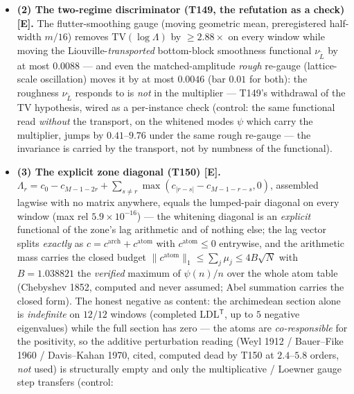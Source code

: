 \documentclass[11pt]{article}
\providecommand{\mE}{\textbf{[E]}}\providecommand{\mC}{\textbf{[C]}}
\begin{document}
\begin{itemize}[leftmargin=1.5em]
$\mathrm{TV}(\log\tilde\Lambda)=0$ \emph{exactly} on every window --- T149's elimination, not
reduction, of T148's blocking scalar --- with the certified entrywise sandwich
$\sigma=c_2/c_1=1.3868$--$2.5805$ (controls: a $1\%$ $Q^\star$ perturbation breaks the identity
at $4.99\times10^{-3}$, and on the shifted indefinite form $A-1.05\lambda_{\min}I$ the
completed-Cholesky floor \emph{refuses} on $12/12$ windows).
\item \textbf{(2) The two-regime discriminator (T149, the refutation as a check) \mE.} The
flutter-smoothing gauge (moving geometric mean, preregistered half-width $m/16$) removes
$\mathrm{TV}(\log\Lambda)$ by $\ge2.88\times$ on every window while moving the
Liouville-\emph{transported} bottom-block smoothness functional $\nu_{\tilde L}$ by at most
$0.0088$ --- and even the matched-amplitude \emph{rough} re-gauge (lattice-scale oscillation)
moves it by at most $0.0046$ (bar $0.01$ for both): the roughness $\nu_{\tilde L}$ responds to
is \emph{not} in the multiplier --- T149's withdrawal of the TV hypothesis, wired as a
per-instance check (control: the same functional read \emph{without} the transport, on the
whitened modes $\psi$ which carry the multiplier, jumps by $0.41$--$9.76$ under the same rough
re-gauge --- the invariance is carried by the transport, not by numbness of the functional).
\item \textbf{(3) The explicit zone diagonal (T150) \mE.}
$\Lambda_r=c_0-c_{M-1-2r}+\sum_{s\ne r}\max(c_{|r-s|}-c_{M-1-r-s},0)$, assembled lagwise with no
matrix anywhere, equals the lumped-pair diagonal on every window (max rel $5.9\times10^{-16}$)
--- the whitening diagonal is an \emph{explicit} functional of the zone's lag arithmetic and of
nothing else; the lag vector splits \emph{exactly} as $c=c^{\mathrm{arch}}+c^{\mathrm{atom}}$
with $c^{\mathrm{atom}}\le0$ entrywise, and the arithmetic mass carries the closed budget
$\|c^{\mathrm{atom}}\|_1\le\sum_j\mu_j\le4B\sqrt N$ with $B=1.038821$ the \emph{verified}
maximum of $\psi(n)/n$ over the whole atom table (Chebyshev 1852, computed and never assumed;
Abel summation carries the closed form). The honest negative as content: the archimedean
section alone is \emph{indefinite} on $12/12$ windows (completed LDL$^{\mathsf T}$, up to $5$
negative eigenvalues) while the full section has zero --- the atoms are \emph{co-responsible}
for the positivity, so the additive perturbation reading (Weyl 1912 / Bauer--Fike 1960 /
Davis--Kahan 1970, cited, computed dead by T150 at $2.4$--$5.8$ orders, \emph{not} used) is
structurally empty and only the multiplicative / Loewner gauge step transfers (control:

\end{itemize}
\end{document}
